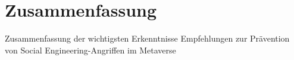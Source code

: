 \chapter{Zusammenfassung}\label{ch:Zusammenfassung}

Zusammenfassung der wichtigsten Erkenntnisse
Empfehlungen zur Prävention von Social Engineering-Angriffen im Metaverse

